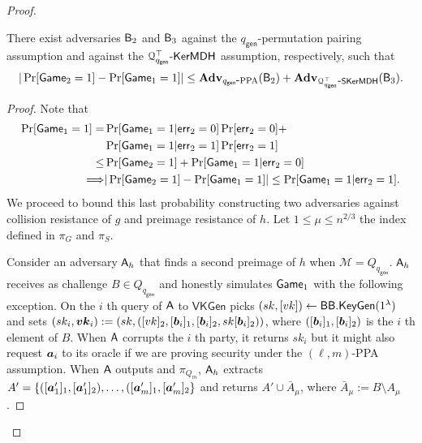 \begin{proof}
\begin{lemma} There exist adversaries $\mathsf{B}_2$ and $\mathsf{B}_3$ against the ${q_\mathsf{gen}}$-permutation pairing assumption and against the $\mathcal{Q}^\top_{{q_\mathsf{gen}}}\mbox{-}\mathsf{KerMDH}$ assumption, respectively, such that
$$
|\Pr[\mathsf{Game}_2=1]-\Pr[\mathsf{Game}_1=1]|\leq \mathbf{Adv}_{{q_\mathsf{gen}}\mbox{-}\mathrm{PPA}}(\mathsf{B}_2)+\mathbf{Adv}_{\mathcal{Q}^\top_{{q_\mathsf{gen}}}\mbox{-}\mathsf{SKerMDH}}(\mathsf{B}_3).
$$\label{lemma:fin}
\end{lemma}
\begin{proof}
Note that
\begin{align*}
\Pr[\mathsf{Game}_1=1]
 = &\Pr[\mathsf{Game}_1=1|\mathsf{err}_2=0]\Pr[\mathsf{err}_2=0]+\\
&\Pr[\mathsf{Game}_1=1|\mathsf{err}_2=1]\Pr[\mathsf{err}_2=1]\\
 \leq& \Pr[\mathsf{Game}_2=1] + \Pr[\mathsf{Game}_1=1|\mathsf{err}_2=0]\\
\Longrightarrow  &|\Pr[\mathsf{Game}_2=1]-\Pr[\mathsf{Game}_1=1]|\leq \Pr[\mathsf{Game}_1=1|\mathsf{err}_2=1].
\end{align*}
We proceed to bound this last probability constructing two adversaries against collision resistance of $g$ and preimage resistance of $h$. Let $1\leq \mu\leq n^{2/3}$ the index defined in $\pi_G$ and $\pi_S$.

Consider an adversary $\mathsf{A}_h$ that finds a second preimage of $h$ when $\mathcal{M}=Q_{q_\mathsf{gen}}$. $\mathsf{A}_h$ receives as challenge $B\in Q_{q_\mathsf{gen}}$ and honestly simulates $\mathsf{Game}_1$ with the following exception. On the $i$ th query of $\mathsf{A}$ to $\mathsf{VKGen}$ picks $(sk,[vk])\gets\mathsf{BB}.\mathsf{KeyGen}(1^\lambda)$ and sets $(sk_i,{\boldsymbol{vk}}_i):=(sk,([vk]_2,[{\boldsymbol{b}}_i]_1,[{\boldsymbol{b}}_i]_2,sk[{\boldsymbol{b}}_i]_2))$, where $([{\boldsymbol{b}}_i]_1,[{\boldsymbol{b}}_i]_2)$ is the $i$ th element of $B$. When $\mathsf{A}$ corrupts the $i$ th party, it returns $sk_i$ but it might also request ${\boldsymbol{a}}_i$ to its oracle if we are proving security under the $(\ell,m)$-PPA assumption. When $\mathsf{A}$ outputs and $\pi_{Q_m}$, $\mathsf{A}_h$ extracts $A'=\{([{\boldsymbol{a}}'_1]_1,[{\boldsymbol{a}}'_1]_2),\ldots,([{\boldsymbol{a}}'_m]_1,[{\boldsymbol{a}}'_m]_2\}$ and returns $A'\cup \bar{A}_\mu$, where $\bar{A}_\mu:= B\setminus A_\mu$.


\end{proof}
\end{proof}
